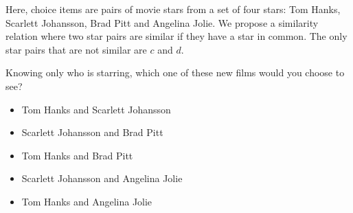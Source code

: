 Here, choice items are pairs of movie stars from a set of four stars: Tom Hanks, Scarlett Johansson, Brad Pitt and Angelina Jolie.
We propose a similarity relation where two star pairs are similar if they have a star in common.
The only star pairs that are not similar are $c$ and $d$.
{}
\begin{tcolorbox}
Knowing only who is starring, which one of these new films would you choose to see?

\begin{itemize}
	\item Tom Hanks and Scarlett Johansson
	\item Scarlett Johansson and Brad Pitt
	\item Tom Hanks and Brad Pitt
	\item Scarlett Johansson and Angelina Jolie
	\item Tom Hanks and Angelina Jolie
\end{itemize}
\end{tcolorbox}
